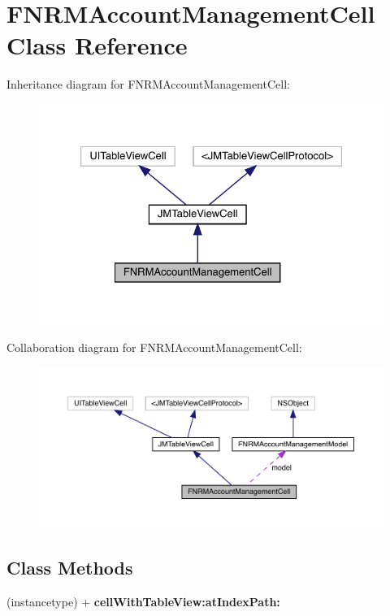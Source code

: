 \hypertarget{interface_f_n_r_m_account_management_cell}{}\section{F\+N\+R\+M\+Account\+Management\+Cell Class Reference}
\label{interface_f_n_r_m_account_management_cell}


Inheritance diagram for F\+N\+R\+M\+Account\+Management\+Cell\+:\nopagebreak
\begin{figure}[H]
\begin{center}
\leavevmode
\includegraphics[width=326pt]{interface_f_n_r_m_account_management_cell__inherit__graph}
\end{center}
\end{figure}


Collaboration diagram for F\+N\+R\+M\+Account\+Management\+Cell\+:\nopagebreak
\begin{figure}[H]
\begin{center}
\leavevmode
\includegraphics[width=350pt]{interface_f_n_r_m_account_management_cell__coll__graph}
\end{center}
\end{figure}
\subsection*{Class Methods}
\begin{DoxyCompactItemize}
\item 
\mbox{\label{interface_f_n_r_m_account_management_cell_a90f8a466c67e2052738f82fb4cd52df1}} 
(instancetype) + {\bfseries cell\+With\+Table\+View\+:at\+Index\+Path\+:}
\end{DoxyCompactItemize}
